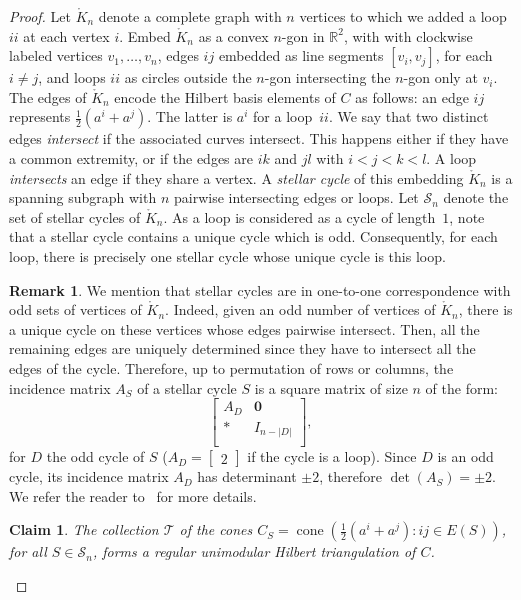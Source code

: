 \documentclass[11pt,a4paper]{amsart}
\theoremstyle{plain}
\newtheorem{claim}[theorem]{Claim}
\theoremstyle{definition}
\newtheorem{remark}[theorem]{Remark}
\newcommand{\cal}[1]{\mathcal{#1}}
\newcommand{\R}{\mathbb{R}}
\DeclareMathOperator{\cone}{cone}
\renewcommand{\cal}[1]{\mathcal{#1}}
\begin{document}
\begin{proof}
Let $\mathring{K}_n$ denote a complete graph with $n$ vertices to which we added a loop $ii$ at each vertex $i$.
Embed $\mathring{K}_n$ as a convex $n$-gon in $\R^2$, with  with clockwise labeled vertices $v_1,\dots,v_n$, edges $ij$ embedded as line segments $[v_i,v_j]$, for each  $i\neq j$, and loops $ii$ as circles outside the $n$-gon intersecting the $n$-gon only at $v_i$.
The edges of $\mathring{K}_n$ encode the Hilbert basis elements of $C$ as follows: an edge $ij$ represents $\frac{1}{2}(a^i+a^j)$. The latter is $a^i$ for a loop~$ii$.
We say that two distinct edges \emph{intersect} if the associated curves intersect.		
This happens either if they have a common extremity, or if the edges are $ik$ and $jl$ with $i<j<k<l$.
A loop \emph{intersects} an edge if they share a vertex.
A \emph{stellar cycle} of this embedding $\mathring{K}_n$ is a spanning subgraph with $n$ pairwise intersecting edges or loops.
Let $\cal S_n$ denote the set of stellar cycles of $\mathring{K}_n$.
As a loop is considered as a cycle of length~$1$, note that a stellar cycle contains a unique cycle which is odd.
Consequently, for each loop, there is precisely one stellar cycle whose unique cycle is this loop.
\begin{remark}\label{remark:edges thrackle} We mention that stellar cycles are in one-to-one correspondence with odd sets of vertices of $\mathring{K}_n$.
Indeed, given an odd number of vertices of $\mathring{K}_n$, there is a unique cycle on these vertices whose edges pairwise intersect. 
Then, all the remaining edges are uniquely determined since they have to intersect all the edges of the cycle. 
Therefore, up to permutation of rows or columns, the incidence matrix $A_S$ of a stellar cycle $S$ is a square matrix of size $n$ of the form:
$$\begin{bmatrix}
	A_D & \mathbf{0}\\
	* & I_{n-|D|}\\
\end{bmatrix},$$
for $D$ the odd cycle of $S$ ($A_D=\begin{bmatrix}2\end{bmatrix}$ if the cycle is a loop). Since $D$ is an odd cycle, its incidence matrix $A_D$ has determinant $\pm 2$, therefore $\det (A_S) = \pm 2$.
We refer the reader to~\cite{DeLoera_Sturmfels_Thomas_1995} for more details.
\end{remark}
\begin{claim}
The collection $\cal T$ of the cones $C_S=\cone(\frac{1}{2}(a^i+a^j)\colon ij\in E(S))$, for all $S\in \cal S_n$, forms a regular unimodular Hilbert triangulation of $C$.

\end{claim}
\end{proof}
\end{document}
